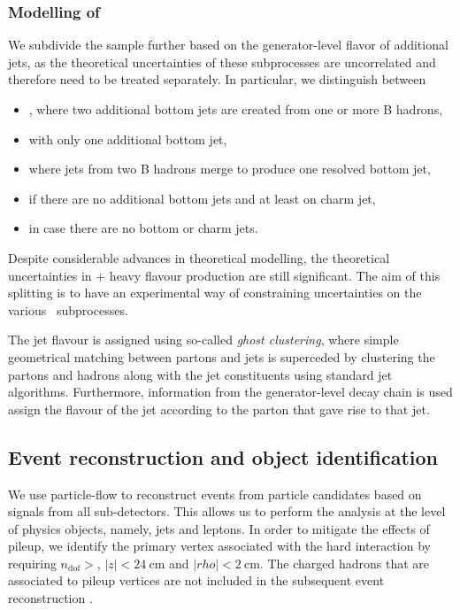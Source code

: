 \subsubsection{Modelling of \ttbar}
\label{sec:ttbar_subprocesses}
We subdivide the \ttbar sample further based on the generator-level flavor of additional jets, as the theoretical uncertainties of these subprocesses are uncorrelated and therefore need to be treated separately. In particular, we distinguish between
\begin{itemize}
\item \ttbb, where two additional bottom jets are created from one or more B hadrons,
\item \ttb with only one additional bottom jet,
\item \tttwob where jets from two B hadrons merge to produce one resolved bottom jet,
\item \ttcc if there are no additional bottom jets and at least on charm jet,
\item \ttlf in case there are no bottom or charm jets.
\end{itemize}
Despite considerable advances in theoretical modelling, the theoretical uncertainties in \ttbar + heavy flavour production are still significant\cite{Cascioli:2013era}. The aim of this splitting is to have an experimental way of constraining uncertainties on the various \ttbar~subprocesses.

The jet flavour is assigned using so-called \textit{ghost clustering}, where simple geometrical matching between partons and jets is superceded by clustering the partons and hadrons along with the jet constituents using standard jet algorithms. Furthermore, information from the generator-level decay chain is used assign the flavour of the jet according to the parton that gave rise to that jet\cite{Bartosik:2047049}.

\subsection{Event reconstruction and object identification}
\label{sec:object_id}
We use particle-flow to reconstruct events from particle candidates based on signals from all sub-detectors. This allows us to perform the analysis at the level of physics objects, namely, jets and leptons\cite{cms_particleflow:2017}. In order to mitigate the effects of pileup, we identify the primary vertex associated with the hard interaction by requiring $n_{\mathrm{dof}} > $, $|z| < 24~\mathrm{cm}$ and $|rho|<2~\mathrm{cm}$. The charged hadrons that are associated to pileup vertices are not included in the subsequent event reconstruction \cite{CMS:2014ata}.

